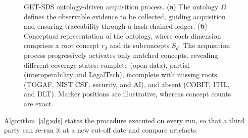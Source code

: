 \documentclass[engproc,proceedingpaper,submit,moreauthors]{Definitions/mdpi}
\begin{document}
\begin{figure}[H]
\caption{GET-SDS ontology-driven acquisition process. (\textbf{a}) The ontology $\Omega$ defines the observable evidence to be collected, guiding acquisition and ensuring traceability through a hash-chained ledger. (\textbf{b}) Conceptual representation of the ontology, where each dimension comprises a root concept $r_d$ and its subconcepts $S_d$. The acquisition process progressively activates only matched concepts, revealing different coverage states: complete (open data), partial (interoperability and LegalTech), incomplete with missing roots (TOGAF, NIST CSF, security, and AI), and absent (COBIT, ITIL, and DLT). Marker positions are illustrative, whereas concept counts are exact.\label{fig:getsds}}
\end{figure}

    Algorithm~\ref{alg:sds} states the procedure executed on every run, so that a third party can re-run it at a new cut-off date and compare artefacts.
\end{document}
